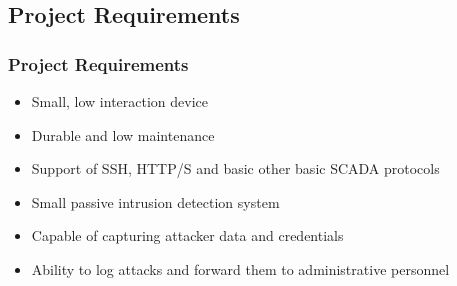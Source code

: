 \subsection{Project Requirements}
\begin{frame}
\frametitle{Project Requirements}

\begin{itemize}
\item Small, low interaction device
\item Durable and low maintenance
\item Support of SSH, HTTP/S and basic other basic SCADA protocols
\item Small passive intrusion detection system
\item Capable of capturing attacker data and credentials
\item Ability to log attacks and forward them to administrative personnel
\end{itemize}

\end{frame}

